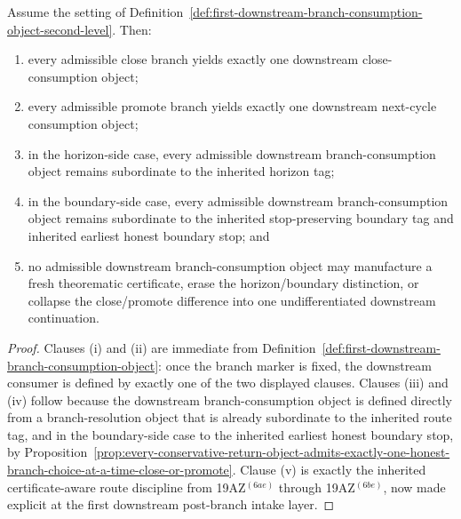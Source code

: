 \begin{proposition}
\label{prop:every-honest-branch-resolution-object-yields-exactly-one-route-faithful-downstream-branch-consumption-object}
Assume the setting of Definition~\ref{def:first-downstream-branch-consumption-object-second-level}. Then:
\begin{enumerate}[label=(\roman*)]
 \item every admissible close branch yields exactly one downstream close-consumption object;
 \item every admissible promote branch yields exactly one downstream next-cycle consumption object;
 \item in the horizon-side case, every admissible downstream branch-consumption object remains subordinate to the inherited horizon tag;
 \item in the boundary-side case, every admissible downstream branch-consumption object remains subordinate to the inherited stop-preserving boundary tag and inherited earliest honest boundary stop; and
 \item no admissible downstream branch-consumption object may manufacture a fresh theorematic certificate, erase the horizon/boundary distinction, or collapse the close/promote difference into one undifferentiated downstream continuation.
\end{enumerate}
\end{proposition}

\begin{proof}
Clauses (i) and (ii) are immediate from Definition~\ref{def:first-downstream-branch-consumption-object}: once the branch marker is fixed, the downstream consumer is defined by exactly one of the two displayed clauses. Clauses (iii) and (iv) follow because the downstream branch-consumption object is defined directly from a branch-resolution object that is already subordinate to the inherited route tag, and in the boundary-side case to the inherited earliest honest boundary stop, by Proposition~\ref{prop:every-conservative-return-object-admits-exactly-one-honest-branch-choice-at-a-time-close-or-promote}. Clause (v) is exactly the inherited certificate-aware route discipline from 19AZ$^{(6ae)}$ through 19AZ$^{(6be)}$, now made explicit at the first downstream post-branch intake layer.
\end{proof}

